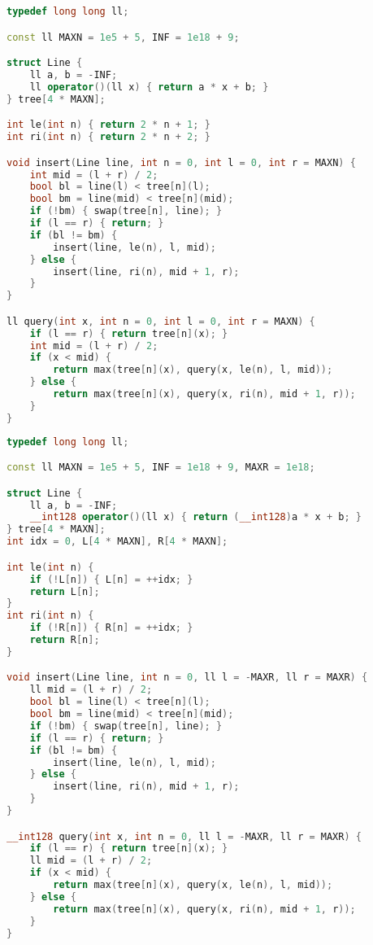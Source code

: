 \documentclass[11pt, a4paper, twoside]{article}
\begin{document}
\begin{lstlisting}[language=C++]
typedef long long ll;

const ll MAXN = 1e5 + 5, INF = 1e18 + 9;

struct Line {
    ll a, b = -INF;
    ll operator()(ll x) { return a * x + b; }
} tree[4 * MAXN];

int le(int n) { return 2 * n + 1; }
int ri(int n) { return 2 * n + 2; }

void insert(Line line, int n = 0, int l = 0, int r = MAXN) {
    int mid = (l + r) / 2;
    bool bl = line(l) < tree[n](l);
    bool bm = line(mid) < tree[n](mid);
    if (!bm) { swap(tree[n], line); }
    if (l == r) { return; }
    if (bl != bm) {
        insert(line, le(n), l, mid);
    } else {
        insert(line, ri(n), mid + 1, r);
    }
}

ll query(int x, int n = 0, int l = 0, int r = MAXN) {
    if (l == r) { return tree[n](x); }
    int mid = (l + r) / 2;
    if (x < mid) {
        return max(tree[n](x), query(x, le(n), l, mid));
    } else {
        return max(tree[n](x), query(x, ri(n), mid + 1, r));
    }
}
\end{lstlisting}

\begin{lstlisting}[language=C++]
typedef long long ll;

const ll MAXN = 1e5 + 5, INF = 1e18 + 9, MAXR = 1e18;

struct Line {
    ll a, b = -INF;
    __int128 operator()(ll x) { return (__int128)a * x + b; }
} tree[4 * MAXN];
int idx = 0, L[4 * MAXN], R[4 * MAXN];

int le(int n) {
    if (!L[n]) { L[n] = ++idx; }
    return L[n];
}
int ri(int n) {
    if (!R[n]) { R[n] = ++idx; }
    return R[n];
}

void insert(Line line, int n = 0, ll l = -MAXR, ll r = MAXR) {
    ll mid = (l + r) / 2;
    bool bl = line(l) < tree[n](l);
    bool bm = line(mid) < tree[n](mid);
    if (!bm) { swap(tree[n], line); }
    if (l == r) { return; }
    if (bl != bm) {
        insert(line, le(n), l, mid);
    } else {
        insert(line, ri(n), mid + 1, r);
    }
}

__int128 query(int x, int n = 0, ll l = -MAXR, ll r = MAXR) {
    if (l == r) { return tree[n](x); }
    ll mid = (l + r) / 2;
    if (x < mid) {
        return max(tree[n](x), query(x, le(n), l, mid));
    } else {
        return max(tree[n](x), query(x, ri(n), mid + 1, r));
    }
}
\end{lstlisting}
\end{document}
